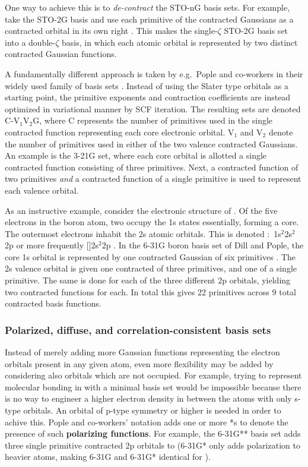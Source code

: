 \documentclass[../../master.tex]{subfiles}
\begin{document}
One way to achieve this is to \emph{de-contract} the \mbox{STO-nG} basis sets. For example, take the \mbox{STO-2G} basis and use each primitive of the contracted Gaussians as a contracted orbital in its own right \cite{cramer}. This makes the single-$\zeta$ \mbox{STO-2G} basis set into a double-$\zeta$ basis, in which each atomic orbital is represented by two distinct contracted Gaussian functions.

A fundamentally different approach is taken by e.g.\ Pople and co-workers in their widely used family of basis sets \cite{hehre1972}. Instead of using the Slater type orbitals as a starting point, the primitive exponents and contraction coefficients are instead optimized in variational manner by SCF iteration. The resulting sets are denoted \mbox{C-V${}_1$V${}_2$G}, where C represents the number of primitives used in the single contracted function representing each core electronic orbital. V${}_1$ and V${}_2$ denote the number of primitives used in either of the two valence contracted Gaussians. An example is the \mbox{3-21G} set, where each core orbital is allotted a single contracted function consisting of three primitives. Next, a contracted function of two primitives \emph{and} a contracted function of a single primitive is used to represent each valence orbital. 

As an instructive example, consider the electronic structure of . Of the five electrons in the boron atom, two occupy the 1s states essentially, forming a  core. The outermost electrons inhabit the 2s atomic orbitals. This is denoted \mbox{: 1s${}^2$2s${}^2$2p} or more frequently \mbox{[]2s${}^2$2p} \cite{griffiths}. In the \mbox{6-31G} boron basis set of Dill and Pople, the core 1s orbital is represented by one contracted Gaussian of six primitives \cite{dill1975}. The 2s valence orbital is given one contracted of three primitives, and one of a single primitive. The same is done for each of the three different 2p orbitals, yielding two contracted functions for each. In total this gives 22 primitives across 9 total contracted basis functions.

\subsubsection{Polarized, diffuse, and correlation-consistent basis sets}
Instead of merely adding more Gaussian functions representing the electron orbitals present in any given atom, even more flexibility may be added by considering also orbitals which are not occupied. For example, trying to represent molecular bonding in  with a minimal basis set would be impossible because there is no way to engineer a higher electron density in between the atoms with only s-type orbitals. An orbital of p-type symmetry or higher is needed in order to achive this. Pople and co-workers' notation adds one or more *s to denote the presence of such {\bf polarizing functions}. For example, the 6-31G** basis set adds three single primitive contracted 2p orbitals to  (6-31G* only adds polarization to heavier atoms, making 6-31G and 6-31G* identical for ). 
\end{document}
